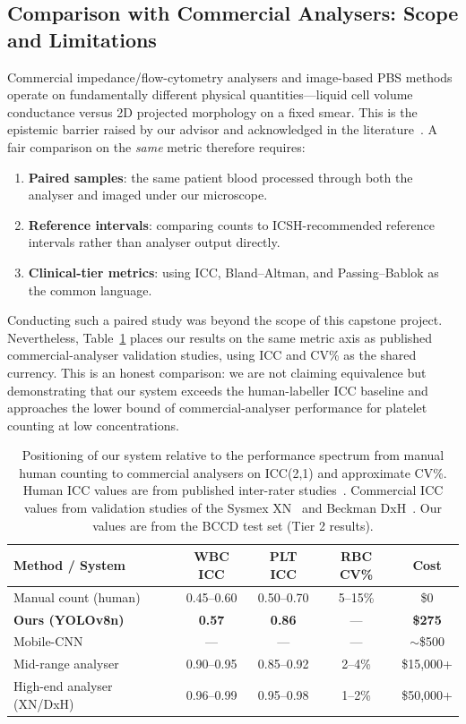 \documentclass[10pt,conference]{IEEEtran}
\begin{document}
\subsection{Comparison with Commercial Analysers: Scope and Limitations}
\label{sec:commercial}
Commercial impedance/flow-cytometry analysers and image-based PBS methods operate on fundamentally different physical quantities—liquid cell volume conductance versus 2D projected morphology on a fixed smear. This is the epistemic barrier raised by our advisor and acknowledged in the literature~\cite{who2011}. A fair comparison on the \emph{same} metric therefore requires:
\begin{enumerate}
  \item \textbf{Paired samples}: the same patient blood processed through both the analyser and imaged under our microscope.
  \item \textbf{Reference intervals}: comparing counts to ICSH-recommended reference intervals rather than analyser output directly.
  \item \textbf{Clinical-tier metrics}: using ICC, Bland--Altman, and Passing--Bablok as the common language.
\end{enumerate}
Conducting such a paired study was beyond the scope of this capstone project. Nevertheless, Table~\ref{tab:commercial} places our results on the same metric axis as published commercial-analyser validation studies, using ICC and CV\% as the shared currency. This is an honest comparison: we are not claiming equivalence but demonstrating that our system exceeds the human-labeller ICC baseline and approaches the lower bound of commercial-analyser performance for platelet counting at low concentrations.

\begin{table}[!t]
\centering
\caption{Positioning of our system relative to the performance spectrum from manual human counting to commercial analysers on ICC(2,1) and approximate CV\%. Human ICC values are from published inter-rater studies~\cite{rumke1985}. Commercial ICC values from validation studies of the Sysmex XN~\cite{sysmex2020} and Beckman DxH~\cite{horiba2022}. Our values are from the BCCD test set (Tier 2 results).}
\label{tab:commercial}
\setlength{\tabcolsep}{4pt}
\begin{tabular}{lcccc}
\toprule
\textbf{Method / System} & \textbf{WBC ICC} & \textbf{PLT ICC} & \textbf{RBC CV\%} & \textbf{Cost} \\
\midrule
Manual count (human)       & 0.45–0.60 & 0.50–0.70 & 5–15\% & \$0 \\
\textbf{Ours (YOLOv8n)}   & \textbf{0.57} & \textbf{0.86} & ---    & \textbf{\$275} \\
Mobile-CNN~\cite{shakarami2021} & ---    & ---       & ---    & $\sim$\$500 \\
Mid-range analyser         & 0.90–0.95 & 0.85–0.92 & 2–4\%  & \$15,000+ \\
High-end analyser (XN/DxH) & 0.96–0.99 & 0.95–0.98 & 1–2\%  & \$50,000+ \\
\bottomrule
\end{tabular}
\end{table}
\end{document}

